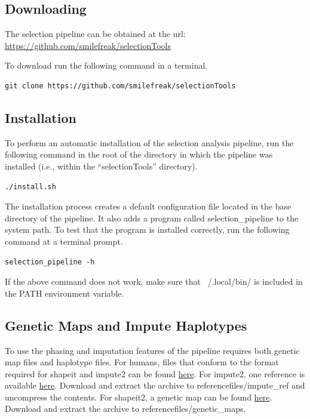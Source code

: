 \documentclass[a4paper,10pt]{article}
\begin{document}
\subsection{Downloading}
The selection pipeline can be obtained at the url:
\href{https://github.com/smilefreak/selectionTools}
{https://github.com/smilefreak/selectionTools}

\noindent
To download run the following command in a terminal.

\begin{verbatim}
git clone https://github.com/smilefreak/selectionTools
\end{verbatim}

\subsection{Installation}

\noindent
To perform an automatic installation of the selection
analysis pipeline, run the following command in the root of the
directory in which the pipeline was installed (i.e., within the
``selectionTools'' directory).\\
\begin{verbatim}
./install.sh
\end{verbatim}

\noindent
The installation process creates a default configuration file located in the base
directory of the pipeline. It also adds a program called
selection\_pipeline to the system path. To test that the program is
installed correctly, run the following command at a terminal prompt.

\begin{verbatim}
selection_pipeline -h
\end{verbatim}

\noindent
If the above command does not work, make sure that ~/.local/bin/ is included in the PATH environment variable.

\subsection{Genetic Maps and Impute Haplotypes}
To use the phasing and imputation features of the pipeline requires
both genetic map files and haplotype files. For humans, files
that conform to the format required for shapeit and impute2 can be
found
\href{http://mathgen.stats.ox.ac.uk/impute/impute_v2.html#reference}{here}. For
impute2, one reference is available
\href{http://mathgen.stats.ox.ac.uk/impute/ALL_1000G_phase1integrated_v3_impute_macGT1.tgz}{here}.
Download and extract the archive to referencefiles/impute\_ref and
uncompress the contents. For shapeit2, a genetic map can be found
\href{http://www.shapeit.fr/files/genetic_map_b37.tar.gz}{here}.
Download and extract the archive to referencefiles/genetic_maps. \\
\end{document}
